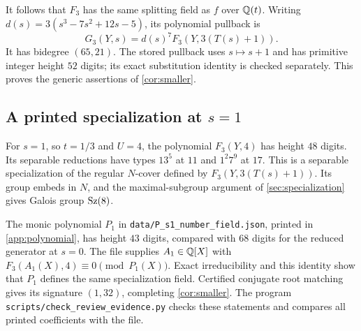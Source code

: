 It follows that $F_3$ has the same splitting field as $f$ over $\mathbb{Q}(t)$.
Writing $d(s)=3(s^3-7s^2+12s-5)$, its polynomial pullback is
\begin{equation}\label{eq:G3}
 G_3(Y,s)=d(s)^7F_3(Y,3(T(s)+1)).
\end{equation}
It has bidegree $(65,21)$. The stored pullback uses $s\mapsto s+1$ and has
primitive integer height $52$ digits; its exact substitution identity is
checked separately.
This proves the generic assertions of \cref{cor:smaller}.

\subsection{A printed specialization at \texorpdfstring{$s=1$}{s=1}}\label{sec:s1}

For $s=1$, so $t=1/3$ and $U=4$, the polynomial $F_3(Y,4)$ has height
$48$ digits. Its separable reductions have types $13^5$ at $11$ and
$1^2 7^9$ at $17$. This is a separable specialization of the regular
$N$-cover defined by $F_3(Y,3(T(s)+1))$. Its group embeds in $N$, and the
maximal-subgroup argument of \cref{sec:specialization} gives Galois group
$\operatorname{Sz}(8)$.

The monic polynomial $P_1$ in
\texttt{data/P\_s1\_number\_field.json}, printed in \cref{app:polynomial},
has height $43$ digits, compared with $68$ digits for the reduced generator
at $s=0$. The file supplies $A_1\in\mathbb{Q}[X]$ with
$F_3(A_1(X),4)\equiv0\pmod{P_1(X)}$. Exact irreducibility and this identity
show that $P_1$ defines the same specialization field. Certified conjugate
root matching gives its signature $(1,32)$, completing
\cref{cor:smaller}. The program \texttt{scripts/check\_review\_evidence.py}
checks these statements and compares all printed coefficients with the file.
